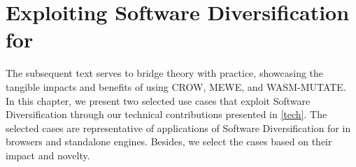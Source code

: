 \chapter{Exploiting Software Diversification for \Wasm}
\label{exploit}

The subsequent text serves to bridge theory with practice, showcasing the tangible impacts and benefits of using CROW, MEWE, and WASM-MUTATE.
In this chapter, we present two selected use cases that exploit Software Diversification through our technical contributions presented in \autoref{tech}.
The selected cases are representative of applications of Software Diversification for \Wasm in browsers and standalone engines.
Besides, we select the cases based on their impact and novelty. 









